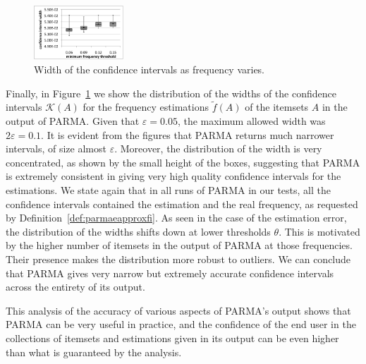 \begin{figure}[htb]
 \centering
    \includegraphics[width=0.3\textwidth]{parma/confintwidth}
  \caption{Width of the confidence intervals as frequency varies.}
  \label{fig:parmaconfintwidth}
\end{figure}

Finally, in Figure~\ref{fig:parmaconfintwidth} we show the distribution of the widths
of the confidence intervals $\mathcal{K}(A)$ for the frequency estimations
$\tilde{f}(A)$ of the itemsets $A$ in the output of PARMA. Given that
$\varepsilon=0.05$, the maximum allowed width was $2\varepsilon=0.1$. It is
evident from the figures that PARMA returns much narrower intervals, of size almost
$\varepsilon$. Moreover, the distribution of the width is very concentrated, as
shown by the small height of the boxes, suggesting that PARMA is extremely
consistent in giving very high quality confidence intervals for the estimations.
We state again that in all runs of PARMA in our tests, all the confidence
intervals contained the estimation and the real frequency, as requested by
Definition~\ref{def:parmaeapproxfi}. As seen in the case of the estimation
error, the distribution of the widths shifts down at lower thresholds $\theta$.
This is motivated by the higher number of itemsets in the output of PARMA at
those frequencies. Their presence makes the distribution more robust to
outliers. We can conclude that PARMA gives very narrow but
extremely accurate confidence intervals across the entirety of its output.

This analysis of the accuracy of various aspects of PARMA's output shows that
PARMA can be very useful in practice, and the confidence of the end user in
the collections of itemsets and estimations given in its output can be even higher
than what is guaranteed by the analysis.

